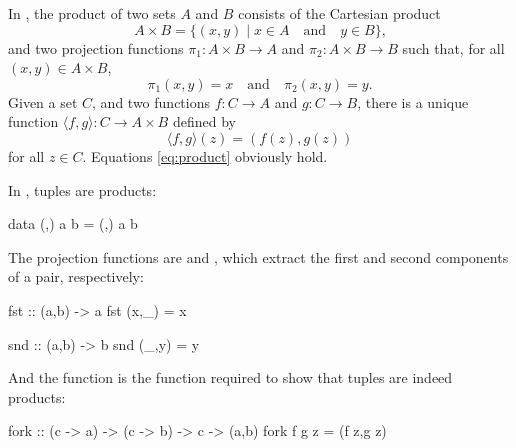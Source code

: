 \begin{example}
  \label{ex:product-set}


  In \set, the product of two sets $A$ and $B$ consists of the
  Cartesian product
  \begin{equation}
    A \times B = \{(x,y) \mid x \in A \quad\text{and}\quad y \in B\}
    \text{,}
  \end{equation}
  and two projection functions $\pi_{1}: A \times B \to A$ and
  $\pi_{2}: A \times B \to B$ such that, for all $(x,y) \in A \times
  B$,
  \begin{equation*}
    \pi_{1}(x,y) = x
    \quad
    \text{and}
    \quad
    \pi_{2}(x,y) = y
    \text{.}
  \end{equation*}
  Given a set $C$, and two functions $f: C \to A$ and $g: C \to B$,
  there is a unique function $\langle{f,g}\rangle: C \to A \times B$
  defined by
  \begin{equation*}
    \langle{f,g}\rangle(z) = (f(z),g(z))
  \end{equation*}
  for all $z \in C$. Equations \eqref{eq:product} obviously hold.

\end{example}

\begin{example}
  \label{ex:product-haskell}

  In \hask, tuples are products:
  \begin{codehaskell}
data (,) a b = (,) a b
  \end{codehaskell}
  The projection functions are  and
  , which extract the first and second components of
  a pair, respectively:
  \begin{codehaskell}
fst :: (a,b) -> a
fst (x,_) = x

snd :: (a,b) -> b
snd (_,y) = y
  \end{codehaskell}
  And the  function is the function required to show
  that tuples are indeed products:
  \begin{codehaskell}
fork :: (c -> a) -> (c -> b) -> c -> (a,b)
fork f g z = (f z,g z)
  \end{codehaskell}

\end{example}

